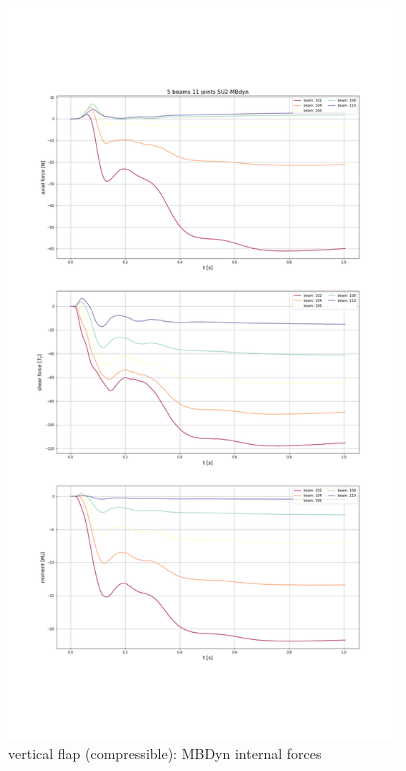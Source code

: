 \begin{figure}[htbp!]
	\centering
	\includegraphics[width=0.92\textwidth, trim=0 230 0 230, clip]{images/comp_flap/vert-flap_SU2-MBDyn_act.png}
	\caption{vertical flap (compressible): MBDyn internal forces}
	\label{fig:comp_mbd_internal}
\end{figure}


\newpage














































